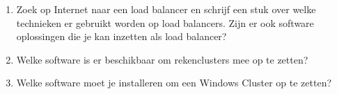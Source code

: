 \begin{enumerate}
\item Zoek op Internet naar een load balancer en schrijf een stuk over welke technieken er gebruikt worden op load balancers. Zijn er ook software oplossingen die je kan inzetten als load balancer?
\item Welke software is er beschikbaar om rekenclusters mee op te zetten?
\item Welke software moet je installeren om een Windows Cluster op te zetten?
\end{enumerate}

